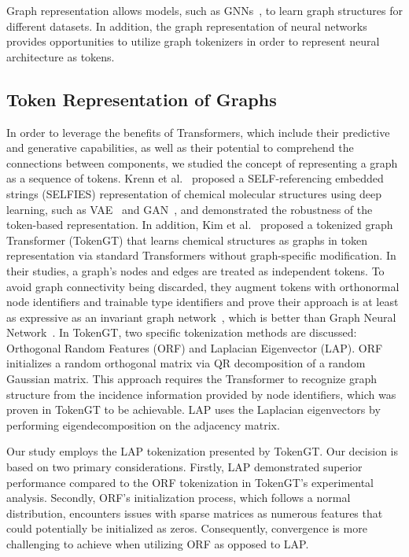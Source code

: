 \documentclass{article}
\begin{document}
Graph representation allows models, such as GNNs~\cite{GNN}, to learn graph structures for different datasets. In addition, the graph representation of neural networks provides opportunities to utilize graph tokenizers in order to represent neural architecture as tokens.

\subsection{Token Representation of Graphs} \label{token-rep-subsection}
In order to leverage the benefits of Transformers, which include their predictive and generative capabilities, as well as their potential to comprehend the connections between components, we studied the concept of representing a graph as a sequence of tokens. Krenn et al.~\cite{SELFIES} proposed a SELF-referencing embedded strings (SELFIES) representation of chemical molecular structures using deep learning, such as VAE~\cite{VAE} and GAN~\cite{GAN}, and demonstrated the robustness of the token-based representation. In addition, Kim et al.~\cite{pure} proposed a tokenized graph Transformer (TokenGT) that learns chemical structures as graphs in token representation via standard Transformers without graph-specific modification. In their studies, a graph's nodes and edges are treated as independent tokens. To avoid graph connectivity being discarded, they augment tokens with orthonormal node identifiers and trainable type identifiers and prove their approach is at least as expressive as an invariant graph network~\cite{2-IGN}, which is better than Graph Neural Network~\cite{GNN}. In TokenGT, two specific tokenization methods are discussed: Orthogonal Random Features (ORF) and Laplacian Eigenvector (LAP). ORF initializes a random orthogonal matrix via QR decomposition of a random Gaussian matrix. This approach requires the Transformer to recognize graph structure from the incidence information provided by node identifiers, which was proven in TokenGT to be achievable. LAP uses the Laplacian eigenvectors by performing eigendecomposition on the adjacency matrix.

Our study employs the LAP tokenization presented by TokenGT. Our decision is based on two primary considerations. Firstly, LAP demonstrated superior performance compared to the ORF tokenization in TokenGT's experimental analysis. Secondly, ORF's initialization process, which follows a normal distribution, encounters issues with sparse matrices as numerous features that could potentially be initialized as zeros. Consequently, convergence is more challenging to achieve when utilizing ORF as opposed to LAP.
\end{document}
